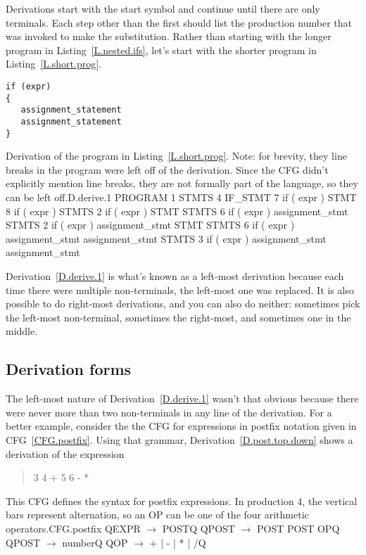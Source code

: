 \documentclass[letterpaper,12pt,openany,reqno]{book}%
\newcommand{\cfgprod}[2] {{\ttfamily #1} $\rightarrow$ {\ttfamily #2}}
\begin{document}
Derivations start with the start symbol and continue until there are only terminals. Each step other than the first should list the production number that was invoked to make the substitution. Rather than starting with the longer program in Listing~\ref{L.nested.ifs}, let's start with the shorter program in Listing~\ref{L.short.prog}.

\begin{lstlisting}[caption={Short program program in the language defined by the CFG in CFG~\ref{F.cfg.2}. The derivation of this program is given in Derivation~\ref{D.derive.1}},label=L.short.prog]
if (expr)
{
   assignment_statement
   assignment_statement
}
\end{lstlisting}

\begin{derivation}{Derivation of the program in Listing~\ref{L.short.prog}. Note: for brevity, they line breaks in the program were left off of the derivation. Since the CFG didn't explicitly mention line breaks, they are not formally part of the language, so they can be left off.}{D.derive.1}
    PROGRAM
1   STMTS
4   IF_STMT
7   if ( expr ) STMT
8   if ( expr ) { STMTS }
2   if ( expr ) { STMT STMTS }
6   if ( expr ) { assignment_stmt STMTS }
2   if ( expr ) { assignment_stmt STMT STMTS }
6   if ( expr ) { assignment_stmt assignment_stmt STMTS }
3   if ( expr ) { assignment_stmt assignment_stmt }
\end{derivation}

Derivation~\ref{D.derive.1} is what's known as a left-most derivation because each time there were multiple non-terminals, the left-most one was replaced. It is also possible to do right-most derivations, and you can also do neither: sometimes pick the left-most non-terminal, sometimes the right-most, and sometimes one in the middle.

\subsection{Derivation forms}\label{S.derive.forms}
The left-most nature of Derivation~\ref{D.derive.1} wasn't that obvious because there were never more than two non-terminals in any line of the derivation. For a better example, consider the the CFG for expressions in postfix notation given in CFG~\ref{CFG.postfix}. Using that grammar, Derivation~\ref{D.post.top.down} shows a derivation of the expression
\begin{quote}
3 4 + 5 6 - *
\end{quote}
\begin{cfg}{This CFG defines the syntax for postfix expressions. In production 4, the vertical bars represent alternation, so an OP can be one of the four arithmetic operators.}{CFG.postfix}
Q\cfgprod{EXPR}{POST}Q
Q\cfgprod{POST}{POST POST OP}Q
Q\cfgprod{POST}{number}Q
Q\cfgprod{OP}{+ | - | * | /}Q
\end{cfg}
\end{document}
